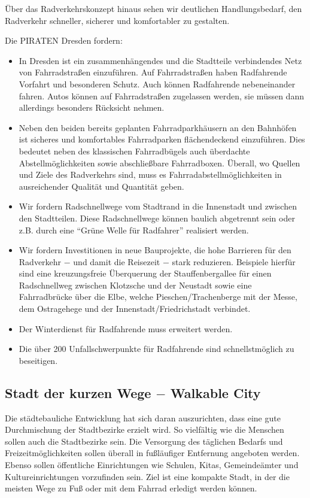 \documentclass[a4paper, 11pt]{article}
\begin{document}
Über das Radverkehrskonzept hinaus sehen wir deutlichen Handlungsbedarf, den Radverkehr schneller, sicherer und komfortabler zu gestalten.

Die PIRATEN Dresden fordern:
\begin{itemize}
    \item In Dresden ist ein zusammenhängendes und die Stadtteile verbindendes Netz von Fahrradstraßen einzuführen. Auf Fahrradstraßen haben Radfahrende Vorfahrt und besonderen Schutz. Auch können Radfahrende nebeneinander fahren. Autos können auf Fahrradstraßen zugelassen werden, sie müssen dann allerdings besonders Rücksicht nehmen.

    \item  Neben den beiden bereits geplanten Fahrradparkhäusern an den Bahnhöfen ist sicheres und komfortables Fahrradparken flächendeckend einzuführen. Dies bedeutet neben des klassischen Fahrradbügels auch überdachte Abstellmöglichkeiten sowie abschließbare Fahrradboxen. Überall, wo Quellen und Ziele des Radverkehrs sind, muss es Fahrradabstellmöglichkeiten in ausreichender Qualität und Quantität geben.

    \item  Wir fordern Radschnellwege vom Stadtrand in die Innenstadt und zwischen den Stadtteilen. Diese Radschnellwege können baulich abgetrennt sein oder z.B. durch eine ``Grüne Welle für Radfahrer'' realisiert werden.

    \item  Wir fordern Investitionen in neue Bauprojekte, die hohe Barrieren für den Radverkehr $-$ und damit die Reisezeit $-$ stark reduzieren. Beispiele hierfür sind eine kreuzungsfreie Überquerung der Stauffenbergallee für einen Radschnellweg zwischen Klotzsche und der Neustadt sowie eine Fahrradbrücke über die Elbe, welche Pieschen/Trachenberge mit der Messe, dem Ostragehege und der Innenstadt/Friedrichstadt verbindet.

    \item  Der Winterdienst für Radfahrende muss erweitert werden.

    \item Die über 200 Unfallschwerpunkte für Radfahrende sind schnellstmöglich zu beseitigen.
\end{itemize}


\subsection{Stadt der kurzen Wege $-$ Walkable City}
Die städtebauliche Entwicklung hat sich daran auszurichten, dass eine gute Durchmischung der Stadtbezirke erzielt wird. So vielfältig wie die Menschen sollen auch die Stadtbezirke sein. Die Versorgung des täglichen Bedarfs und Freizeitmöglichkeiten sollen überall in fußläufiger Entfernung angeboten werden. Ebenso sollen öffentliche Einrichtungen wie Schulen, Kitas, Gemeindeämter und Kultureinrichtungen vorzufinden sein. Ziel ist eine kompakte Stadt, in der die meisten Wege zu Fuß oder mit dem Fahrrad erledigt werden können.\newline
\end{document}
